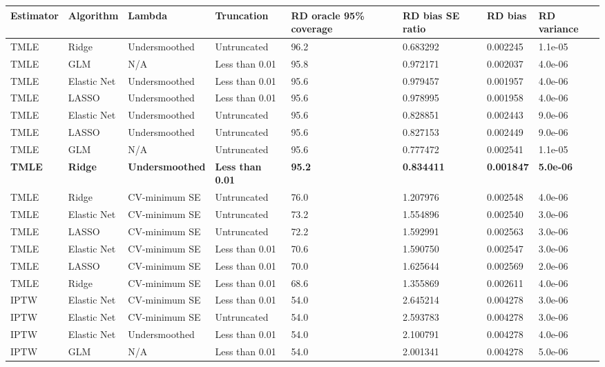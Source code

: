 
\begin{longtable}[l]{llllllll}
\toprule
Estimator & Algorithm & Lambda & Truncation & RD oracle 95\% coverage & RD bias SE ratio & RD bias & RD variance\\
\midrule
TMLE & Ridge & Undersmoothed & Untruncated & 96.2 & 0.683292 & 0.002245 & 1.1e-05\\
TMLE & GLM & N/A & Less than 0.01 & 95.8 & 0.972171 & 0.002037 & 4.0e-06\\
TMLE & Elastic Net & Undersmoothed & Less than 0.01 & 95.6 & 0.979457 & 0.001957 & 4.0e-06\\
TMLE & LASSO & Undersmoothed & Less than 0.01 & 95.6 & 0.978995 & 0.001958 & 4.0e-06\\
TMLE & Elastic Net & Undersmoothed & Untruncated & 95.6 & 0.828851 & 0.002443 & 9.0e-06\\
TMLE & LASSO & Undersmoothed & Untruncated & 95.6 & 0.827153 & 0.002449 & 9.0e-06\\
TMLE & GLM & N/A & Untruncated & 95.6 & 0.777472 & 0.002541 & 1.1e-05\\
\midrule
\textbf{TMLE} & \textbf{Ridge} & \textbf{Undersmoothed} & \textbf{Less than 0.01} & \textbf{95.2} & \textbf{0.834411} & \textbf{0.001847} & \textbf{5.0e-06}\\
\midrule
TMLE & Ridge & CV-minimum SE & Untruncated & 76.0 & 1.207976 & 0.002548 & 4.0e-06\\
TMLE & Elastic Net & CV-minimum SE & Untruncated & 73.2 & 1.554896 & 0.002540 & 3.0e-06\\
TMLE & LASSO & CV-minimum SE & Untruncated & 72.2 & 1.592991 & 0.002563 & 3.0e-06\\
TMLE & Elastic Net & CV-minimum SE & Less than 0.01 & 70.6 & 1.590750 & 0.002547 & 3.0e-06\\
TMLE & LASSO & CV-minimum SE & Less than 0.01 & 70.0 & 1.625644 & 0.002569 & 2.0e-06\\
TMLE & Ridge & CV-minimum SE & Less than 0.01 & 68.6 & 1.355869 & 0.002611 & 4.0e-06\\
IPTW & Elastic Net & CV-minimum SE & Less than 0.01 & 54.0 & 2.645214 & 0.004278 & 3.0e-06\\
IPTW & Elastic Net & CV-minimum SE & Untruncated & 54.0 & 2.593783 & 0.004278 & 3.0e-06\\
IPTW & Elastic Net & Undersmoothed & Less than 0.01 & 54.0 & 2.100791 & 0.004278 & 4.0e-06\\
IPTW & GLM & N/A & Less than 0.01 & 54.0 & 2.001341 & 0.004278 & 5.0e-06\\

\end{longtable}

